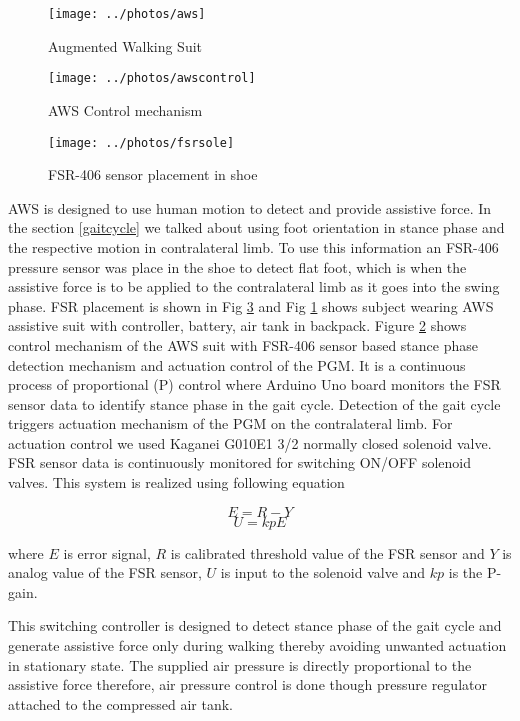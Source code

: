 \documentclass[letterpaper, 10 pt, conference]{ieeeconf}  %
\begin{document}
\begin{figure}
	\centering
	\texttt{[image: ../photos/aws]}
	\caption{Augmented Walking Suit}
	\label{fig:aws}
\end{figure}


\begin{figure}
	\centering
	\texttt{[image: ../photos/awscontrol]}
	\caption{AWS Control mechanism}
	\label{fig:awssystem}
\end{figure}
\begin{figure}
	\centering
	\texttt{[image: ../photos/fsrsole]}
	\caption{FSR-406 sensor placement in shoe}
	\label{fig:fsrsole}
\end{figure}


AWS is designed to use human motion to detect and provide assistive force. In the section \ref{gaitcycle} we talked about using foot orientation in stance phase and the respective motion in contralateral limb. To use this information an FSR-406 pressure sensor was place in the shoe to detect flat foot, which is when the assistive force is to be applied to the contralateral limb as it goes into the swing phase. FSR placement is shown in Fig \ref{fig:fsrsole} and Fig \ref {fig:aws} shows subject wearing AWS assistive suit with controller, battery, air tank in backpack. Figure \ref{fig:awssystem} shows control mechanism of the AWS suit with FSR-406 sensor based stance phase detection mechanism and actuation control of the PGM. It is a continuous process of proportional (P) control where Arduino Uno board monitors the FSR sensor data to identify stance phase in the gait cycle. Detection of the gait cycle triggers actuation mechanism of the PGM on the contralateral limb. For actuation control we used Kaganei G010E1 3/2 normally closed solenoid valve. FSR sensor data is continuously monitored for switching ON/OFF solenoid valves. This system is realized using following equation 

\begin{equation}\label{kevalue}
E = R - Y 
\end{equation}
\begin{equation}\label{uvalue}
U = kpE
\end{equation}

where $E$ is error signal, $R$ is calibrated threshold value of the FSR sensor and $Y$ is analog value of the FSR sensor, $U$ is input to the solenoid valve and $kp$ is the P-gain. 

This switching controller is designed to detect stance phase of the gait cycle and generate assistive force only during walking thereby avoiding unwanted actuation in stationary state. The supplied air pressure is directly proportional to the assistive force therefore, air pressure control is done though pressure regulator attached to the compressed air tank.
\end{document}
